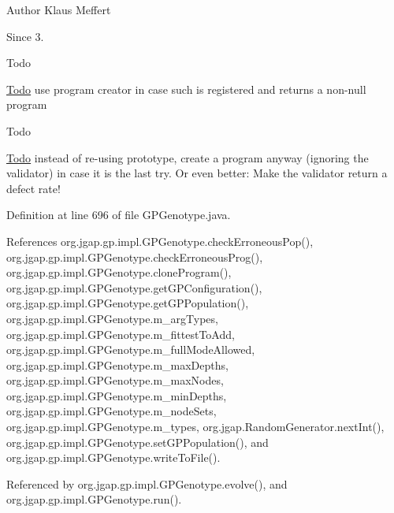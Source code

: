 \begin{DoxyAuthor}{Author}
Klaus Meffert 
\end{DoxyAuthor}
\begin{DoxySince}{Since}
3. 
\end{DoxySince}
\begin{DoxyRefDesc}{Todo}
\item[\hyperlink{todo__todo000148}{Todo}]use program creator in case such is registered and returns a non-\/null program \end{DoxyRefDesc}


\begin{DoxyRefDesc}{Todo}
\item[\hyperlink{todo__todo000149}{Todo}]instead of re-\/using prototype, create a program anyway (ignoring the validator) in case it is the last try. Or even better\-: Make the validator return a defect rate! \end{DoxyRefDesc}


Definition at line 696 of file G\-P\-Genotype.\-java.



References org.\-jgap.\-gp.\-impl.\-G\-P\-Genotype.\-check\-Erroneous\-Pop(), org.\-jgap.\-gp.\-impl.\-G\-P\-Genotype.\-check\-Erroneous\-Prog(), org.\-jgap.\-gp.\-impl.\-G\-P\-Genotype.\-clone\-Program(), org.\-jgap.\-gp.\-impl.\-G\-P\-Genotype.\-get\-G\-P\-Configuration(), org.\-jgap.\-gp.\-impl.\-G\-P\-Genotype.\-get\-G\-P\-Population(), org.\-jgap.\-gp.\-impl.\-G\-P\-Genotype.\-m\-\_\-arg\-Types, org.\-jgap.\-gp.\-impl.\-G\-P\-Genotype.\-m\-\_\-fittest\-To\-Add, org.\-jgap.\-gp.\-impl.\-G\-P\-Genotype.\-m\-\_\-full\-Mode\-Allowed, org.\-jgap.\-gp.\-impl.\-G\-P\-Genotype.\-m\-\_\-max\-Depths, org.\-jgap.\-gp.\-impl.\-G\-P\-Genotype.\-m\-\_\-max\-Nodes, org.\-jgap.\-gp.\-impl.\-G\-P\-Genotype.\-m\-\_\-min\-Depths, org.\-jgap.\-gp.\-impl.\-G\-P\-Genotype.\-m\-\_\-node\-Sets, org.\-jgap.\-gp.\-impl.\-G\-P\-Genotype.\-m\-\_\-types, org.\-jgap.\-Random\-Generator.\-next\-Int(), org.\-jgap.\-gp.\-impl.\-G\-P\-Genotype.\-set\-G\-P\-Population(), and org.\-jgap.\-gp.\-impl.\-G\-P\-Genotype.\-write\-To\-File().



Referenced by org.\-jgap.\-gp.\-impl.\-G\-P\-Genotype.\-evolve(), and org.\-jgap.\-gp.\-impl.\-G\-P\-Genotype.\-run().



